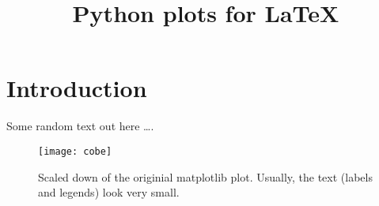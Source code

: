 \documentclass[twocolumn,a4paper]{scrartcl}
\title{Python plots for LaTeX}
\begin{document}
\maketitle
\section{Introduction}
Some random text out here \dots.
%
\begin{figure}
  \centering
  \texttt{[image: cobe]}
  \caption{Scaled down of the originial matplotlib plot.
    Usually, the text (labels and legends) look very small.}
  \label{image1}
\end{figure}
%
\end{document}
